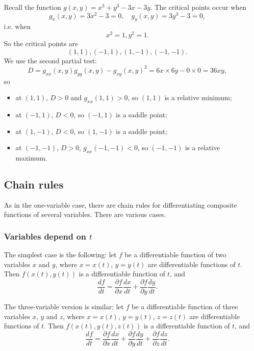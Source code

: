   \begin{example}
    Recall the function $g(x, y) = x^3 + y^3 - 3x - 3y$.  The critical points occur when
      \[
        g_x(x, y) = 3x^2 - 3 = 0, \quad g_y(x, y) = 3y^3 - 3 = 0,
      \]
    i.e. when
      \[
        x^2 = 1, y^2 = 1.
      \]
    So the critical points are
      \[
        (1, 1), (-1, 1), (1, -1), (-1, -1).
      \]
    We use the second partial test:
      \[
        D = g_{xx}(x, y)g_{yy}(x, y) - g_{xy}(x, y)^2 = 6x \times 6y - 0 \times 0 = 36xy,
      \]
    so
      \begin{itemize}
        \item at $(1, 1)$, $D > 0$ and $g_{xx}(1, 1) > 0$, so $(1, 1)$ is a relative minimum;
        \item at $(-1, 1)$, $D < 0$, so $(-1, 1)$ is a saddle point;
        \item at $(1, -1)$, $D < 0$, so $(1, -1)$ is a saddle point;
        \item at $(-1, -1)$, $D > 0$, $g_{xx}(-1, -1) < 0$, so $(-1, -1)$ is a relative maximum.
      \end{itemize}
  \end{example}


  \subsection{Chain rules}

  As in the one-variable case, there are chain rules for differentiating composite functions of several variables.  There are various cases.

  \subsubsection*{Variables depend on $t$}

  The simplest case is the following:  let $f$ be a differentiable function of two variables $x$ and $y$, where $x = x(t)$, $y = y(t)$ are differentiable functions of $t$.  Then $f(x(t), y(t))$ is a differentiable function of $t$, and
    \[
      \frac{df}{dt} = \frac{\partial f}{\partial x}\frac{dx}{dt} + \frac{\partial f}{\partial y}\frac{dy}{dt}.
    \]

  The three-variable version is similar: let $f$ be a differentiable function of three variables $x$, $y$ and $z$, where $x = x(t)$, $y = y(t)$, $z = z(t)$ are differentiable functions of $t$.  Then $f(x(t), y(t), z(t))$ is a differentiable function of $t$, and
    \[
      \frac{df}{dt} = \frac{\partial f}{\partial x}\frac{dx}{dt} + \frac{\partial f}{\partial y}\frac{dy}{dt} + \frac{\partial f}{\partial z}\frac{dz}{dt}.
    \]

